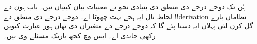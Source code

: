 \documentclass[../../../include/open-logic-chapter]{subfiles}
\begin{document}

\begin{editorial}
ہُن تک دوجے درجے دی منطق دی بنیادی نحو تے معنیات بیان
کیتیاں نیں۔ باب ہون دے لحاظ نال ایہ ہجے بہت چھوٹا اے۔
دوجے درجے دی منطق دے !!{derivation} نظاماں بارے گل کرن لئی
پہلاں ایہ دسنا پئے گا کہ دوجے درجے دے متغیراں دی تھاں ہور
عبارت کیویں رکھی جاندی اے۔ ایس وچ کجھ باریک مسئلے وی نیں۔
\end{editorial}







\OLEndChapterHook
\end{document}
